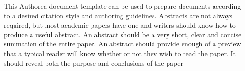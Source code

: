 This Authorea document template can be used to prepare documents according to a desired citation style and authoring guidelines. Abstracts are not always required, but most academic papers have one and writers should know how to produce a useful abstract. An abstract should be a very short, clear and concise summation of the entire paper. An abstract should provide enough of a preview that a typical reader will know whether or not they wish to read the paper. It should reveal both the purpose and conclusions of the paper.